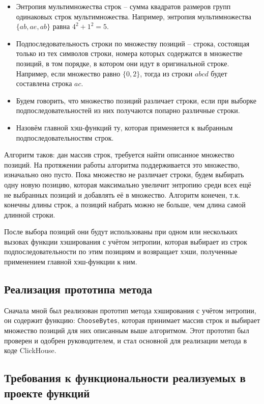 \documentclass[a4paper,12pt]{extarticle}
\begin{document}
\begin{sloppypar}
\begin{itemize}
	\item Энтропия мультимножества строк -- сумма квадратов размеров групп одинаковых строк мультимножества. Например, энтропия мультимножества $\{ab, ae, ab\}$ равна $4^2+1^2 = 5$.
	\item Подпоследовательность строки по множеству позиций -- строка, состоящая только из тех символов строки, номера которых содержатся в множестве позиций, в том порядке, в котором они идут в оригинальной строке. Например, если множество равно $\{0, 2\}$, тогда из строки $abcd$ будет составлена строка $ac$.
	\item Будем говорить, что множество позиций различает строки, если при выборке подпоследовательностей из них получаются попарно различные строки.
	\item Назовём главной хэш-функций ту, которая применяется к выбранным подпоследовательностям строк.
\end{itemize}

Алгоритм таков: дан массив строк, требуется найти описанное множество позиций. На протяжении работы алгоритма поддерживается это множество, изначально оно пусто. Пока множество не различает строки, будем выбирать одну новую позицию, которая максимально увеличит энтропию среди всех ещё не выбранных позиций и добавлять её в множество. Алгоритм конечен, т.к. конечны длины строк, а позиций набрать можно не больше, чем длина самой длинной строки.

После выбора позиций они будут использованы при одном или нескольких вызовах функции хэширования с учётом энтропии, которая выбирает из строк подпоследовательности по этим позициям и возвращает хэши, полученные применением главной хэш-функции к ним.  

\subsection{Реализация прототипа метода}

Сначала мной был реализован прототип метода хэширования с учётом энтропии, он содержит функцию: \texttt{ChooseBytes}, которая принимает массив строк и выбирает множество позиций для них описанным выше алгоритмом. Этот прототип был проверен и одобрен руководителем, и стал основной для реализации метода в коде ClickHouse.

\subsection{Требования к функциональности реализуемых в проекте функций}


\end{sloppypar}
\end{document}
